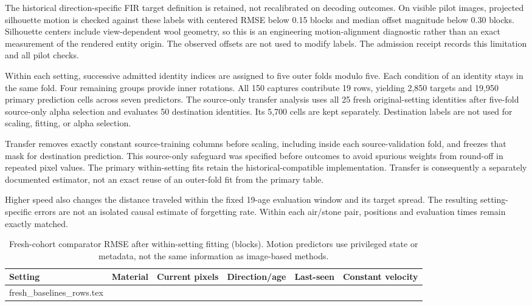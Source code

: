 \documentclass{article}
\makeatletter
\let\tablerows\@@input
\makeatother
\begin{document}
The historical direction-specific FIR target definition is retained, not recalibrated on decoding outcomes. On visible pilot images, projected silhouette motion is checked against these labels with centered RMSE below 0.15 blocks and median offset magnitude below 0.30 blocks. Silhouette centers include view-dependent wool geometry, so this is an engineering motion-alignment diagnostic rather than an exact measurement of the rendered entity origin. The observed offsets are not used to modify labels. The admission receipt records this limitation and all pilot checks.

Within each setting, successive admitted identity indices are assigned to five outer folds modulo five. Each condition of an identity stays in the same fold. Four remaining groups provide inner rotations. All 150 captures contribute 19 rows, yielding 2,850 targets and 19,950 primary prediction cells across seven predictors. The source-only transfer analysis uses all 25 fresh original-setting identities after five-fold source-only alpha selection and evaluates 50 destination identities. Its 5,700 cells are kept separately. Destination labels are not used for scaling, fitting, or alpha selection.

Transfer removes exactly constant source-training columns before scaling, including inside each source-validation fold, and freezes that mask for destination prediction. This source-only safeguard was specified before outcomes to avoid spurious weights from round-off in repeated pixel values. The primary within-setting fits retain the historical-compatible implementation. Transfer is consequently a separately documented estimator, not an exact reuse of an outer-fold fit from the primary table.

Higher speed also changes the distance traveled within the fixed 19-age evaluation window and its target spread. The resulting setting-specific errors are not an isolated causal estimate of forgetting rate. Within each air/stone pair, positions and evaluation times remain exactly matched.

\begin{table}[!htbp]
\caption{Fresh-cohort comparator RMSE after within-setting fitting (blocks). Motion predictors use privileged state or metadata, not the same information as image-based methods.}
\centering\small
\begin{tabular}{@{}llrrrr@{}}
\toprule
Setting & Material & Current pixels & Direction/age & Last-seen & Constant velocity\\
\midrule
\tablerows fresh_baselines_rows.tex
\bottomrule
\end{tabular}
\end{table}
\end{document}
